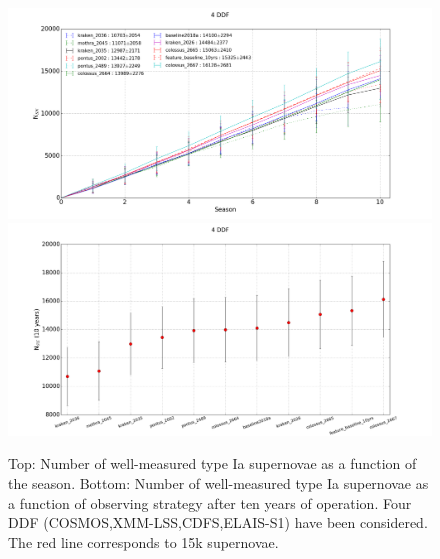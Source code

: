 \documentclass [11pt,a4paper]{article}
\newcommand{\cosmos}{COSMOS}
\newcommand{\xmmlss}{XMM-LSS}
\newcommand{\cdfs}{CDFS}
\newcommand{\elais}{ELAIS-S1}
\begin{document}
\begin{figure}[htbp]
\begin{center}
  
  \includegraphics[width=15cm]{Figures/NSN_season_4DDF.png}
  \includegraphics[width=15cm]{Figures/NSN_all_4DDF.png}
 \caption{Top: Number of well-measured type Ia supernovae as a function of the season. Bottom: Number of  well-measured type Ia supernovae as a function of observing strategy after ten years of operation. Four DDF (\cosmos,\xmmlss,\cdfs,\elais) have been considered. The red line corresponds to 15k supernovae.}\label{fig:nsn_four}
\end{center}
\end{figure}
\end{document}
